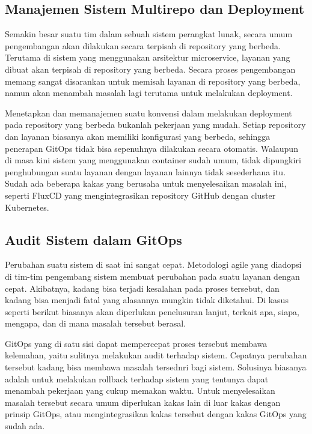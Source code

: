 \subsection{Manajemen Sistem Multirepo dan Deployment}
Semakin besar suatu tim dalam sebuah sistem perangkat lunak, secara umum pengembangan akan dilakukan secara terpisah di repository yang berbeda. Terutama di sistem yang menggunakan arsitektur microservice, layanan yang dibuat akan terpisah di repository yang berbeda. Secara proses pengembangan memang sangat disarankan untuk memisah layanan di repository yang berbeda, namun akan menambah masalah lagi terutama untuk melakukan deployment.

Menetapkan dan memanajemen suatu konvensi dalam melakukan deployment pada repository yang berbeda bukanlah pekerjaan yang mudah. Setiap repository dan layanan biasanya akan memiliki konfigurasi yang berbeda, sehingga penerapan GitOps tidak bisa sepenuhnya dilakukan secara otomatis. Walaupun di masa kini sistem yang menggunakan container sudah umum, tidak dipungkiri penghubungan suatu layanan dengan layanan lainnya tidak sesederhana itu. Sudah ada beberapa kakas yang berusaha untuk menyelesaikan masalah ini, seperti FluxCD yang mengintegrasikan repository GitHub dengan cluster Kubernetes.

\subsection{Audit Sistem dalam GitOps}

Perubahan suatu sistem di saat ini sangat cepat. Metodologi agile yang diadopsi di tim-tim pengembang sistem membuat perubahan pada suatu layanan dengan cepat. Akibatnya, kadang bisa terjadi kesalahan pada proses tersebut, dan kadang bisa menjadi fatal yang alasannya mungkin tidak diketahui. Di kasus seperti berikut biasanya akan diperlukan penelusuran lanjut, terkait apa, siapa, mengapa, dan di mana masalah tersebut berasal.

GitOps yang di satu sisi dapat mempercepat proses tersebut membawa kelemahan, yaitu sulitnya melakukan audit terhadap sistem. Cepatnya perubahan tersebut kadang bisa membawa masalah tersednri bagi sistem. Solusinya biasanya adalah untuk melakukan rollback terhadap sistem yang tentunya dapat menambah pekerjaan yang cukup memakan waktu. Untuk menyelesaikan masalah tersebut secara umum diperlukan kakas lain di luar kakas dengan prinsip GitOps, atau mengintegrasikan kakas tersebut dengan kakas GitOps yang sudah ada.

